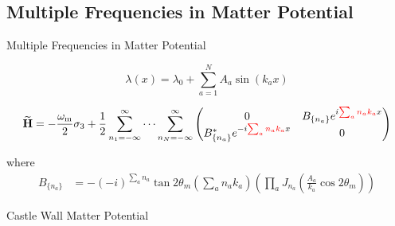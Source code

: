 \documentclass[9pt]{beamer}
\begin{document}
\begin{darkframes}
\begin{frame}
\end{frame}



\subsection{Multiple Frequencies in Matter Potential}


\begin{frame}{Multiple Frequencies in Matter Potential}




\begin{equation*}
\lambda(x) = \lambda_0 + \sum_{a=1}^N A_a \sin(k_a x )
\end{equation*}


\begin{tcolorbox}[title=Hamiltonian in Rabi Basis]


\begin{equation*}
\mathbf{\widetilde H}= -\frac{\omega_{\mathrm m}}{2}\sigma_3 + \frac{1}{2} \sum_{n_1=-\infty}^\infty \cdots \sum_{n_N=-\infty}^\infty \begin{pmatrix}
0 &  B_{\{n_a\}} e^{i  {\color{red} \sum_a n_a k_a } x}\\
  B_{\{n_a\}}^* e^{ -i  {\color{red} \sum_a n_a k_a } x} & 0
\end{pmatrix}
\end{equation*}


where
\begin{align*}
    B_{\{n_a\}} &= -(-i)^{\sum_a n_a} \tan 2\theta_m \left( \sum_a n_a k_a \right) \left( \prod_a J_{n_a}\left( \frac{A_a}{k_a}\cos 2\theta_m \right) \right)
\end{align*}




\end{tcolorbox}




\end{frame}



\begin{frame}{Castle Wall Matter Potential}



\begin{columns}[T]
\begin{column}{0.5\textwidth}

\end{column}
\end{columns}
\end{frame}
\end{darkframes}
\end{document}
